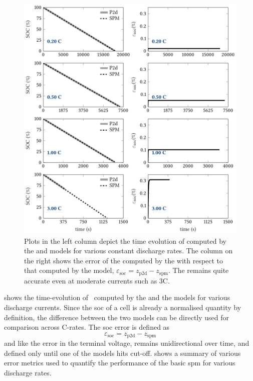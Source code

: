 \begin{figure}[!htb]
    \centering
    \includegraphics[width=\textwidth]{4/figures/const_curr_dischg_soc.pdf}
    \caption[ computed by  and
     models for constant current discharge]{Plots in the left
        column depict the time evolution of  computed by the
         and  models for various constant
        discharge rates. The column on the right shows the error of the
         computed by the  with respect to that
        computed by the  model, \ie{} $ \varepsilon_\text{soc}
        = {z_\text{p2d}} - z_\text{spm} $. The  remains quite
    accurate even at moderate currents such as 3C.}
    \label{fig:cnstdischgspmp2dsoc}
\end{figure}

  shows  the  time-evolution  of~
computed by the   and the   models for various
discharge  currents. Since  the  \gls{soc} of  a cell  is  already a  normalised
quantity by  definition, the difference between  the two models can  be directly
used for comparison across C-rates. The \gls{soc} error is defined as
\begin{equation}
    \varepsilon_\text{soc} = {z_\text{p2d}} - z_\text{spm}
\end{equation}
and   like  the   error  in   the  terminal   voltage,  remains   unidirectional
over  time,   and  defined  only   until  one   of  the  models   hits  cut-off.
  shows  a  summary of  various  error
metrics used  to quantify  the performance  of the  basic \gls{spm}  for various
discharge rates.

